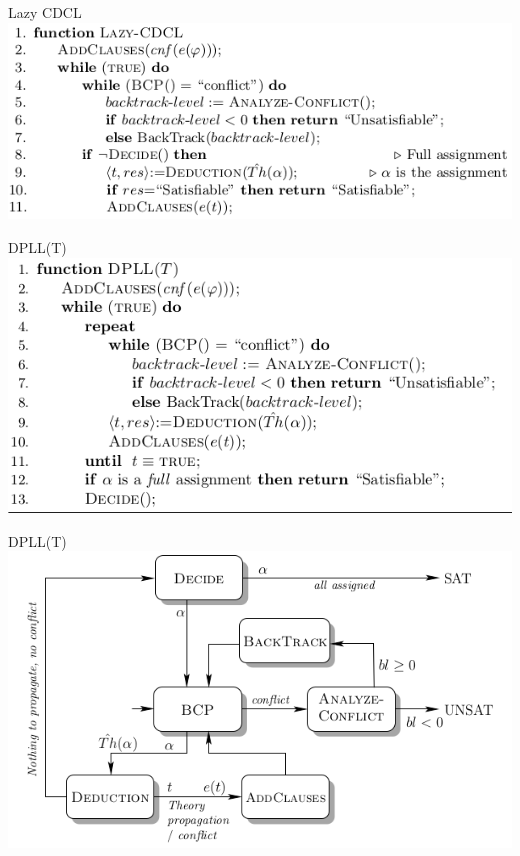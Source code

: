 \documentclass{beamer}
\begin{document}
\begin{frame}{Lazy CDCL}
\includegraphics[scale=0.5]{Lazy_CDCL.png}
\end{frame}

\begin{frame}{DPLL(T)}
\includegraphics[scale=0.5]{DPLL1.png}
\end{frame}

\begin{frame}{DPLL(T)}
\includegraphics[scale=0.5]{DPLL2.png}
\end{frame}
\end{document}
